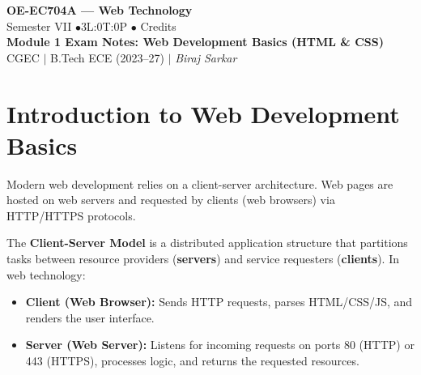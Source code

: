 \documentclass[12pt,a4paper]{article}
\begin{document}

\begin{center}
  {\LARGE\bfseries\color{myred} OE-EC704A --- Web Technology}\\[5pt]
  {\normalsize\color{mydark} Semester VII \quad$\bullet$\quad 3L:0T:0P \quad$\bullet$ Credits}\\[3pt]
  {\normalsize\color{myteal}\textbf{Module 1 Exam Notes: Web Development Basics (HTML \& CSS)}}\\[3pt]
  {\small\color{mydark} CGEC \;$|$\; B.Tech ECE (2023--27) \;$|$\; \textit{Biraj Sarkar}}
\end{center}
\vspace{2pt}
\noindent{\color{myred}\rule{\linewidth}{1.5pt}}
\vspace{2pt}

\hypersetup{linkcolor=mydark}
\tableofcontents
\hypersetup{linkcolor=myteal}
\newpage

\section{Introduction to Web Development Basics}

Modern web development relies on a client-server architecture. Web pages are hosted on web servers and requested by clients (web browsers) via HTTP/HTTPS protocols.

\begin{tcolorbox}[defbox, title={\textbf{Client-Server Web Architecture}}]
The \textbf{Client-Server Model} is a distributed application structure that partitions tasks between resource providers (\textbf{servers}) and service requesters (\textbf{clients}). In web technology:
\begin{itemize}[leftmargin=*, itemsep=3pt]
  \item \textbf{Client (Web Browser):} Sends HTTP requests, parses HTML/CSS/JS, and renders the user interface.
  \item \textbf{Server (Web Server):} Listens for incoming requests on ports 80 (HTTP) or 443 (HTTPS), processes logic, and returns the requested resources.
\end{itemize}
\end{tcolorbox}
\end{document}
